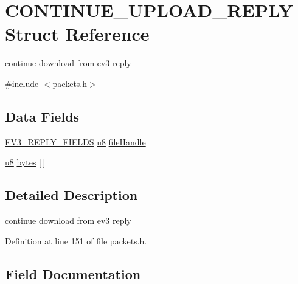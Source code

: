\hypertarget{struct_c_o_n_t_i_n_u_e___u_p_l_o_a_d___r_e_p_l_y}{}\section{C\+O\+N\+T\+I\+N\+U\+E\+\_\+\+U\+P\+L\+O\+A\+D\+\_\+\+R\+E\+P\+L\+Y Struct Reference}
\label{struct_c_o_n_t_i_n_u_e___u_p_l_o_a_d___r_e_p_l_y}


continue download from ev3 reply  




{\ttfamily \#include $<$packets.\+h$>$}

\subsection*{Data Fields}
\begin{DoxyCompactItemize}
\item 
\hyperlink{packets_8h_a382c165d520d462ac8f0c88e2a1970cb}{E\+V3\+\_\+\+R\+E\+P\+L\+Y\+\_\+\+F\+I\+E\+L\+D\+S} \hyperlink{defs_8h_a92c50087ca0e64fa93fc59402c55f8ca}{u8} \hyperlink{struct_c_o_n_t_i_n_u_e___u_p_l_o_a_d___r_e_p_l_y_afdfd867e8243b0ae1e245e467179c567}{file\+Handle}
\item 
\hyperlink{defs_8h_a92c50087ca0e64fa93fc59402c55f8ca}{u8} \hyperlink{struct_c_o_n_t_i_n_u_e___u_p_l_o_a_d___r_e_p_l_y_a1fdde1580342b6b1df0d8f5213c45107}{bytes} \mbox{[}$\,$\mbox{]}
\end{DoxyCompactItemize}


\subsection{Detailed Description}
continue download from ev3 reply 

Definition at line 151 of file packets.\+h.



\subsection{Field Documentation}
\hypertarget{struct_c_o_n_t_i_n_u_e___u_p_l_o_a_d___r_e_p_l_y_a1fdde1580342b6b1df0d8f5213c45107}{}
